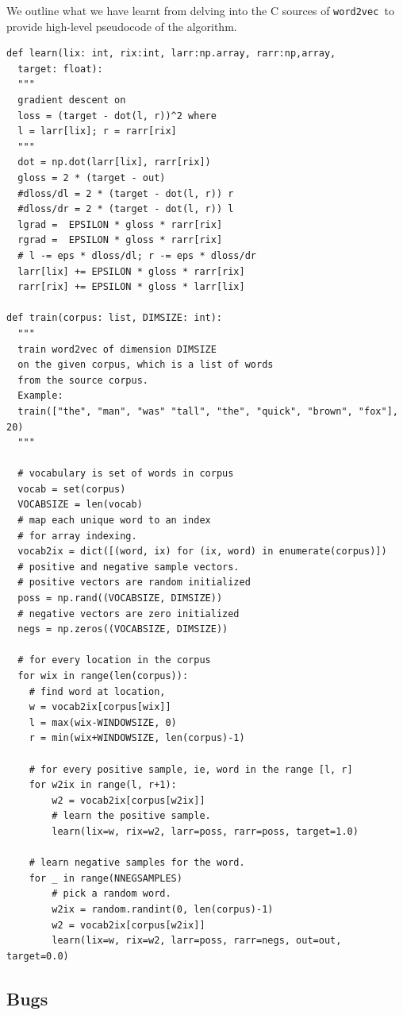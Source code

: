 \documentclass[11pt]{book}
\newcommand{\wtov}{\texttt{word2vec }}
\begin{document}
We outline what we have learnt from delving into the C sources
of \wtov to provide high-level pseudocode of the algorithm.
\begin{verbatim}
def learn(lix: int, rix:int, larr:np.array, rarr:np,array,
  target: float):
  """
  gradient descent on 
  loss = (target - dot(l, r))^2 where
  l = larr[lix]; r = rarr[rix]
  """
  dot = np.dot(larr[lix], rarr[rix])
  gloss = 2 * (target - out)
  #dloss/dl = 2 * (target - dot(l, r)) r
  #dloss/dr = 2 * (target - dot(l, r)) l
  lgrad =  EPSILON * gloss * rarr[rix]
  rgrad =  EPSILON * gloss * rarr[rix]
  # l -= eps * dloss/dl; r -= eps * dloss/dr
  larr[lix] += EPSILON * gloss * rarr[rix]
  rarr[rix] += EPSILON * gloss * larr[lix]

def train(corpus: list, DIMSIZE: int):
  """
  train word2vec of dimension DIMSIZE 
  on the given corpus, which is a list of words
  from the source corpus.
  Example:
  train(["the", "man", "was" "tall", "the", "quick", "brown", "fox"], 20)
  """

  # vocabulary is set of words in corpus
  vocab = set(corpus) 
  VOCABSIZE = len(vocab)
  # map each unique word to an index
  # for array indexing.
  vocab2ix = dict([(word, ix) for (ix, word) in enumerate(corpus)])
  # positive and negative sample vectors.
  # positive vectors are random initialized
  poss = np.rand((VOCABSIZE, DIMSIZE))
  # negative vectors are zero initialized
  negs = np.zeros((VOCABSIZE, DIMSIZE))

  # for every location in the corpus
  for wix in range(len(corpus)):
    # find word at location, 
    w = vocab2ix[corpus[wix]]
    l = max(wix-WINDOWSIZE, 0)
    r = min(wix+WINDOWSIZE, len(corpus)-1)

    # for every positive sample, ie, word in the range [l, r]
    for w2ix in range(l, r+1):
        w2 = vocab2ix[corpus[w2ix]]
        # learn the positive sample.
        learn(lix=w, rix=w2, larr=poss, rarr=poss, target=1.0)

    # learn negative samples for the word.
    for _ in range(NNEGSAMPLES)
        # pick a random word.
        w2ix = random.randint(0, len(corpus)-1)
        w2 = vocab2ix[corpus[w2ix]]
        learn(lix=w, rix=w2, larr=poss, rarr=negs, out=out, target=0.0)
\end{verbatim}

\subsection{Bugs}
\end{document}
